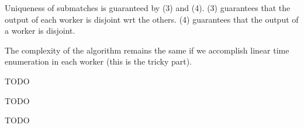 \documentclass[12pt, a4paper]{article}
\begin{document}
Uniqueness of submatches is guaranteed by (3) and (4).
(3) guarantees that the output of each worker is disjoint wrt the others.
(4) guarantees that the output of a worker is disjoint.

The complexity of the algorithm remains the same if we accomplish linear time enumeration in each worker (this is the tricky part).

\begin{lemma}[TODO]
  \label{lemma:todo}
  TODO
\end{lemma}

\begin{theorem}[TODO]
  \label{theorem:todo}
  TODO
\end{theorem}

\begin{example}[TODO]
  \label{example:todo}
  TODO
\end{example}




%
\end{document}
